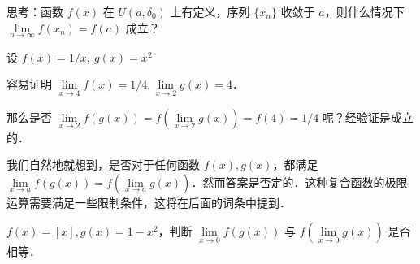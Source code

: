 \begin{exercise}{}
思考：函数 $f(x)$ 在 $U(a,\delta_0)$ 上有定义，序列 $\{x_n\}$ 收敛于 $a$，则什么情况下 $\lim\limits_{n\rightarrow \infty}f(x_n)=f(a)$ 成立？
\end{exercise}
设 $f(x)=1/x,\ g(x)=x^2$

  容易证明 $\lim\limits_{x\rightarrow 4}f(x)=1/4,\lim\limits_{x\rightarrow 2}g(x)=4$．

  那么是否 $\lim\limits_{x\rightarrow 2}f(g(x))=f(\lim\limits_{x\rightarrow 2}g(x))=f(4)=1/4$ 呢？经验证是成立的．

  我们自然地就想到，是否对于任何函数 $f(x),g(x)$，都满足 $\lim\limits_{x\rightarrow a}f(g(x))=f(\lim\limits_{x\rightarrow a}g(x))$．然而答案是否定的．这种复合函数的极限运算需要满足一些限制条件，这将在后面的词条中提到．
\begin{exercise}{}
$f(x)=[x],g(x)=1-x^2$，判断 $\lim\limits_{x\rightarrow 0}f(g(x)) $ 与 $f(\lim\limits_{x\rightarrow 0}g(x))$ 是否相等．
\end{exercise}